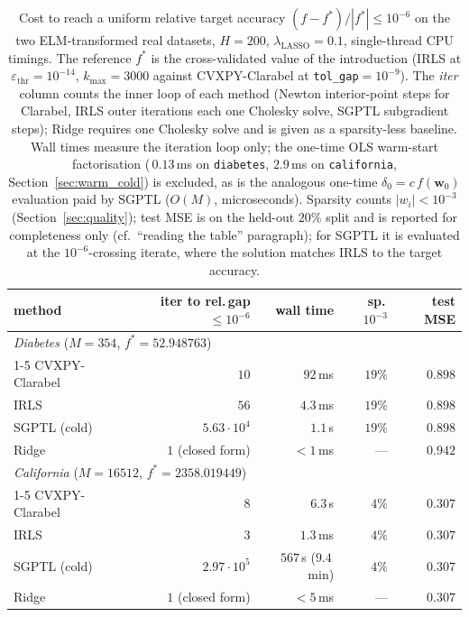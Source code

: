 \begin{table}[H]
    \centering
    \small
    \setlength{\tabcolsep}{5pt}
    \begin{tabular}{lrrrr}
        \toprule
        method & iter to rel.\,gap$\le 10^{-6}$ & wall time & sp.\,$10^{-3}$ & test MSE \\
        \midrule
        \multicolumn{5}{l}{\emph{Diabetes} ($M=354$, $f^{*}=52.948763$)} \\
        \cmidrule(lr){1-5}
        CVXPY-Clarabel & $10$              & $92$\,ms            & $19\%$ & $0.898$ \\
        IRLS           & $56$              & $4.3$\,ms           & $19\%$ & $0.898$ \\
        SGPTL (cold)   & $5.63\cdot 10^{4}$ & $1.1$\,s           & $19\%$ & $0.898$ \\
        Ridge          & $1$ (closed form) & $< 1$\,ms           & ---    & $0.942$ \\
        \midrule
        \multicolumn{5}{l}{\emph{California} ($M=16512$, $f^{*}=2358.019449$)} \\
        \cmidrule(lr){1-5}
        CVXPY-Clarabel & $8$               & $6.3$\,s            & $\phantom{0}4\%$ & $0.307$ \\
        IRLS           & $3$               & $1.3$\,ms           & $\phantom{0}4\%$ & $0.307$ \\
        SGPTL (cold)   & $2.97\cdot 10^{5}$ & $567$\,s ($9.4$\,min) & $\phantom{0}4\%$ & $0.307$ \\
        Ridge          & $1$ (closed form) & $< 5$\,ms           & ---              & $0.307$ \\
        \bottomrule
    \end{tabular}
    \caption{Cost to reach a uniform relative target accuracy
    $(f - f^{*})/|f^{*}| \le 10^{-6}$ on the two ELM-transformed real datasets,
    $H=200$, $\lambda_\text{LASSO}=0.1$, single-thread CPU timings. The
    reference $f^{*}$ is the cross-validated value of the introduction
    (IRLS at $\varepsilon_\text{thr}=10^{-14}$, $k_{\max}=3000$ against
    CVXPY-Clarabel at \texttt{tol\_gap}$=10^{-9}$). The
    \emph{iter} column counts the inner loop of each method (Newton
    interior-point steps for Clarabel, IRLS outer iterations each one
    Cholesky solve, SGPTL subgradient steps); Ridge requires one
    Cholesky solve and is given as a sparsity-less baseline. Wall times
    measure the iteration loop only; the one-time OLS warm-start
    factorisation (\,$0.13$\,ms on \texttt{diabetes}, $2.9$\,ms on
    \texttt{california}, Section~\ref{sec:warm_cold}) is excluded, as
    is the analogous one-time $\delta_{0}=c\,f(\mathbf{w}_{0})$
    evaluation paid by SGPTL ($O(M)$, microseconds). Sparsity counts
    $|w_{i}|<10^{-3}$ (Section~\ref{sec:quality}); test MSE is on the
    held-out $20\%$ split and is reported for completeness only
    (cf.\ ``reading the table'' paragraph); for SGPTL it is evaluated at
    the $10^{-6}$-crossing iterate, where the solution matches IRLS to the
    target accuracy.}
    \label{tab:real_data}
\end{table}

